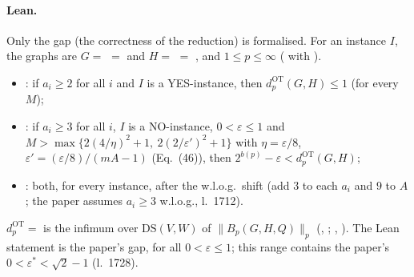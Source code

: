 \paragraph{Lean.} Only the gap (the correctness of the reduction) is formalised. For an instance $I$, the
graphs are $G=$  $=$  and
$H=$  $=$ , and $1\le p\le\infty$
( with ).
\begin{itemize}
\item {}: if $a_i\ge2$ for all $i$ and $I$ is a
  YES-instance, then $d^{\mathrm{OT}}_p(G,H)\le1$ (for every $M$);
\item {}: if $a_i\ge3$ for all $i$, $I$ is a
  NO-instance, $0<\varepsilon\le1$ and $M>\max\{2(4/\eta)^2+1,\ 2(2/\varepsilon')^2+1\}$ with
  $\eta=\varepsilon/8$, $\varepsilon'=(\varepsilon/8)/(mA-1)$ (Eq.~(46)), then
  $2^{b(p)}-\varepsilon<d^{\mathrm{OT}}_p(G,H)$;
\item {}: both, for every instance, after the
  w.l.o.g.\ shift (add $3$ to each $a_i$ and $9$ to $A$; the paper assumes $a_i\ge3$ w.l.o.g., l.~1712).
\end{itemize}
$d^{\mathrm{OT}}_p=$  is the infimum over $\mathrm{DS}(V,W)$ of $\|B_p(G,H,Q)\|_p$
(, ; , ).
The Lean statement is the paper's gap, for all $0<\varepsilon\le1$; this range contains the paper's
$0<\varepsilon^*<\sqrt2-1$ (l.~1728).

